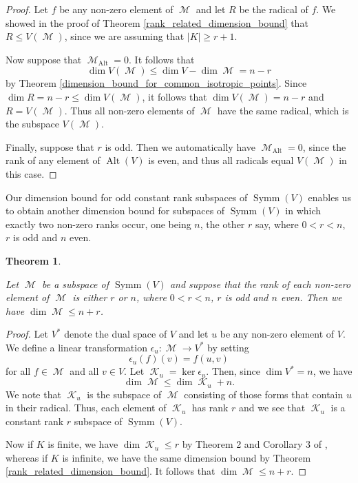\documentclass{amsart}
\DeclareMathOperator{\Alt}{Alt}
\DeclareMathOperator{\M}{\mathcal{M}}
\DeclareMathOperator{\K}{\mathcal{K}}
\DeclareMathOperator{\Symm}{Symm}
\theoremstyle{plain}
\newtheorem{theorem}{Theorem}
\theoremstyle{definition}
\begin{document}
\begin{proof}
 
Let $f$ be any non-zero element of $\M$ and let $R$ be the radical of $f$. We showed in the proof of 
Theorem \ref{rank_related_dimension_bound} that $R\leq V(\M)$, since we are assuming that $|K|\geq r+1$.

Now suppose that $\M_{\Alt}=0$. It follows that
\[
 \dim V(\M)\leq \dim V-\dim \M=n-r
\]
by Theorem \ref{dimension_bound_for_common_isotropic_points}. Since $\dim R=n-r\leq \dim V(\M)$, it follows that $\dim V(\M)=n-r$ and $R=V(\M)$.
Thus all non-zero elements of $\M$ have the same radical, which is the subspace $V(\M)$.

Finally, suppose that $r$ is odd. Then we automatically have $\M_{\Alt}=0$, since the rank of any element of $\Alt(V)$ is even, and thus all radicals
equal $V(\M)$ in this case. 
\end{proof}



Our dimension bound for odd constant rank subspaces of $\Symm(V)$ enables us to obtain another dimension bound for subspaces of
$\Symm(V)$ in which exactly two non-zero ranks occur, one being $n$, the other $r$ say, where $0<r<n$, $r$ is odd and $n$ even.

\begin{theorem} \label{two_rank_subspace}
 
Let $\M$ be a subspace of $\Symm(V)$ and suppose that the rank of each non-zero element of $\M$ is either $r$ or $n$, where $0<r<n$, $r$ is odd 
and $n$ even.  Then we have
$\dim \M\leq n+r$. 
\end{theorem}




\begin{proof}
 Let $V^*$ denote the dual space of $V$ and let $u$ be any non-zero element of $V$. We define a linear transformation $\epsilon_u:\M\to V^*$
by setting
\[
 \epsilon_u(f)(v)=f(u,v)
\]
for all $f\in\M$ and all $v\in V$. Let $\K_u=\ker \epsilon_u$. Then, since $\dim V^*=n$, we have
\[
 \dim \M\leq \dim \K_u+n.
\]
We note that $\K_u$ is the subspace of $\M$ consisting of those forms that contain $u$ in their radical. Thus, each element
of $\K_u$ has rank $r$ and we see that $\K_u$ is a constant rank $r$ subspace of $\Symm(V)$. 

Now if $K$ is finite, we have $\dim \K_u\leq r$ by Theorem 2 and Corollary 3 of \cite{Du}, whereas if $K$ is infinite, we have the same dimension
bound by Theorem \ref{rank_related_dimension_bound}. It follows that $\dim \M\leq n+r$.

\end{proof}
\end{document}
